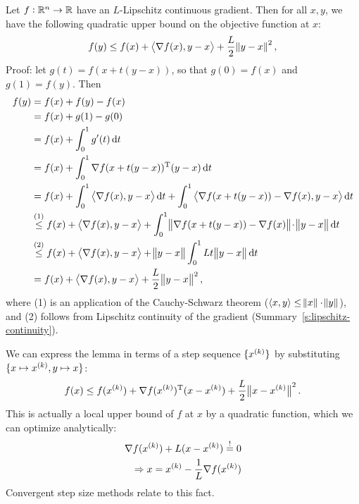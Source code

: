 \documentclass{article}
\begin{document}
\label{s:descent-lemma}

Let \(f: \mathbb{R}^n \to \mathbb{R}\) have an \(L\)-Lipschitz continuous gradient.  Then for all \(x, y\), we
have the following quadratic upper bound on the objective function at \(x\):
\begin{equation*}
  f(y) \leq f(x) + \iprod{\nabla f(x)}{y - x} + \frac{L}{2}\enVert{y - x}^2,
\end{equation*}
Proof: let \(g(t) = f(x + t(y - x))\), so that \(g(0) = f(x)\) and \(g(1) = f(y)\). Then
\begin{align*}
  f(y) &= f(x) + f(y) - f(x) \\
       &= f(x) + g(1) - g(0) \\
       &= f(x) + \int_0^1 g'(t) \dif t \\
       &= f(x) + \int_0^1 \T{\nabla f(x + t(y - x))} (y - x) \dif t \\
       &= f(x) + \int_0^1 \iprod{\nabla f(x)}{y - x} \dif t
         + \int_0^1 \iprod{\nabla f(x + t(y - x)) - \nabla f(x)}{y - x} \dif t \\
       &\overset{(1)}{\leq} f(x) + \iprod{\nabla f(x)}{y - x}
         + \int_0^1 \enVert[1]{\nabla f(x + t(y - x)) - \nabla f(x)}\! \cdot \enVert[1]{y - x} \dif t \\
       &\overset{(2)}{\leq} f(x) + \iprod{\nabla f(x)}{y - x} + \enVert[1]{y - x} \int_0^1 Lt\enVert[1]{y - x} \dif t \\
       &= f(x) + \iprod{\nabla f(x)}{y - x} + \frac{L}{2}\enVert[1]{y - x}^2,
\end{align*}
where (1) is an application of the Cauchy-Schwarz theorem
(\(\langle x, y \rangle \leq \enVert{x} \cdot \enVert{y}\)), and (2) follows from Lipschitz
continuity of the gradient (Summary~\ref{s:lipschitz-continuity}).


\label{s:descent-lemma-interpretation}

We can express the lemma in terms of a step sequence \(\{x^{(k)}\}\) by substituting
\(\{x \mapsto x^{(k)}, y \mapsto x\}\):
\begin{equation*}
  f(x) \leq f(\kth{x}) + \T{\nabla f(\kth{x})}(x - \kth{x}) + \frac{L}{2}\enVert[1]{x - \kth{x}}^2.
\end{equation*}
This is actually a local upper bound of \(f\) at \(x\) by a quadratic function, which we can
optimize analytically:
\begin{gather*}
  \nabla f(x^{(k)}) + L (x - x^{(k)}) \overset{!}{=} 0\\
  \quad \Rightarrow x = x^{(k)} - \frac{1}{L} \nabla f(x^{(k)})
\end{gather*}
Convergent step size methods relate to this fact.
\end{document}
